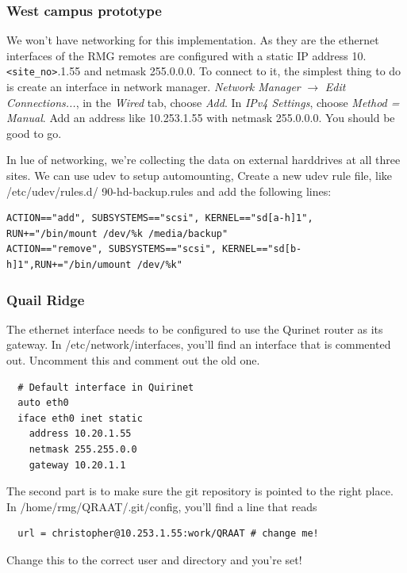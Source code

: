 \documentclass[letter]{article}
\begin{document}
\subsubsection{West campus prototype}
We won't have networking for this implementation. As they are the ethernet interfaces of the RMG 
remotes are configured with a static IP address 10.\texttt{<site\_no>}.1.55 and netmask 255.0.0.0. 
To connect to it, the simplest thing to do is create an interface 
in network manager. \textit{Network Manager} $\rightarrow$ \textit{Edit Connections...}, in the 
\textit{Wired} tab, choose \textit{Add}. In \textit{IPv4 Settings}, choose \textit{Method = Manual}. 
Add an address like 10.253.1.55 with netmask 255.0.0.0. You should be good to go.  

In lue of networking, we're collecting the data on external harddrives at all three sites. We 
can use udev to setup automounting, Create a new udev rule file, like /etc/udev/rules.d/
90-hd-backup.rules and add the following lines:
\begin{verbatim}
ACTION=="add", SUBSYSTEMS=="scsi", KERNEL=="sd[a-h]1", RUN+="/bin/mount /dev/%k /media/backup"
ACTION=="remove", SUBSYSTEMS=="scsi", KERNEL=="sd[b-h]1",RUN+="/bin/umount /dev/%k"
\end{verbatim}


\subsubsection{Quail Ridge}
The ethernet interface needs to be configured to use the Qurinet router as its gateway. 
In /etc/network/interfaces, you'll find an interface that is commented out. 
Uncomment this and comment out the old one. 
\begin{verbatim}
  # Default interface in Quirinet
  auto eth0 
  iface eth0 inet static
    address 10.20.1.55
    netmask 255.255.0.0
    gateway 10.20.1.1
\end{verbatim}

The second part is to make sure the git repository is pointed to the right place. In 
/home/rmg/QRAAT/.git/config, you'll find a line that reads
\begin{verbatim}
  url = christopher@10.253.1.55:work/QRAAT # change me!
\end{verbatim}
Change this to the correct user and directory and you're set!
\end{document}
